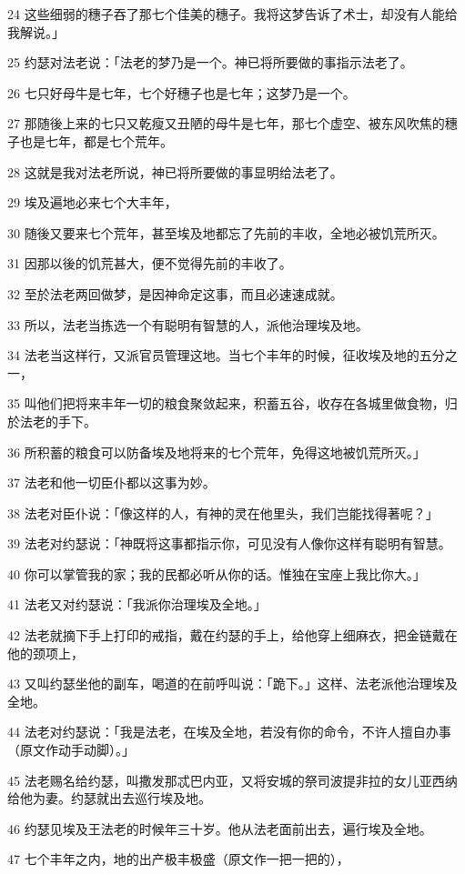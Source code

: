 \par 24 这些细弱的穗子吞了那七个佳美的穗子。我将这梦告诉了术士，却没有人能给我解说。」
\par 25 约瑟对法老说：「法老的梦乃是一个。神已将所要做的事指示法老了。
\par 26 七只好母牛是七年，七个好穗子也是七年；这梦乃是一个。
\par 27 那随後上来的七只又乾瘦又丑陋的母牛是七年，那七个虚空、被东风吹焦的穗子也是七年，都是七个荒年。
\par 28 这就是我对法老所说，神已将所要做的事显明给法老了。
\par 29 埃及遍地必来七个大丰年，
\par 30 随後又要来七个荒年，甚至埃及地都忘了先前的丰收，全地必被饥荒所灭。
\par 31 因那以後的饥荒甚大，便不觉得先前的丰收了。
\par 32 至於法老两回做梦，是因神命定这事，而且必速速成就。
\par 33 所以，法老当拣选一个有聪明有智慧的人，派他治理埃及地。
\par 34 法老当这样行，又派官员管理这地。当七个丰年的时候，征收埃及地的五分之一，
\par 35 叫他们把将来丰年一切的粮食聚敛起来，积蓄五谷，收存在各城里做食物，归於法老的手下。
\par 36 所积蓄的粮食可以防备埃及地将来的七个荒年，免得这地被饥荒所灭。」
\par 37 法老和他一切臣仆都以这事为妙。
\par 38 法老对臣仆说：「像这样的人，有神的灵在他里头，我们岂能找得著呢？」
\par 39 法老对约瑟说：「神既将这事都指示你，可见没有人像你这样有聪明有智慧。
\par 40 你可以掌管我的家；我的民都必听从你的话。惟独在宝座上我比你大。」
\par 41 法老又对约瑟说：「我派你治理埃及全地。」
\par 42 法老就摘下手上打印的戒指，戴在约瑟的手上，给他穿上细麻衣，把金链戴在他的颈项上，
\par 43 又叫约瑟坐他的副车，喝道的在前呼叫说：「跪下。」这样、法老派他治理埃及全地。
\par 44 法老对约瑟说：「我是法老，在埃及全地，若没有你的命令，不许人擅自办事（原文作动手动脚）。」
\par 45 法老赐名给约瑟，叫撒发那忒巴内亚，又将安城的祭司波提非拉的女儿亚西纳给他为妻。约瑟就出去巡行埃及地。
\par 46 约瑟见埃及王法老的时候年三十岁。他从法老面前出去，遍行埃及全地。
\par 47 七个丰年之内，地的出产极丰极盛（原文作一把一把的），
